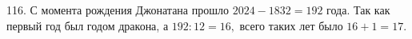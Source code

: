 116. С момента рождения Джонатана прошло $2024-1832=192$ года. Так как первый год был годом дракона, а $192:12=16,$  всего таких лет было $16+1=17.$\\
